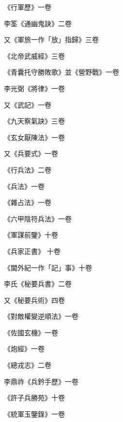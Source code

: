 \begin{pinyinscope}
 《行軍歷》一卷



 李筌《通幽鬼訣》二卷



 又《軍旅一作「放」指歸》三卷



 《北帝武威經》三卷



 《青囊托守勝敗歌》並《營野戰》一卷



 李光弼《將律》一卷



 又《武記》一卷



 《九天察氣訣》三卷



 《玄女厭陳法》一卷



 又《兵要式》一卷



 《行兵法》二卷



 《兵法》一卷



 《雜占法》一卷



 《六甲陰符兵法》一卷



 《軍謀前鑒》十卷



 《兵家正書》
 十卷



 《閫外紀一作「記」事》十卷



 李氏《秘要兵書》二卷



 又《秘要兵術》四卷



 《對敵權變逆順法》一卷



 《佐國玄機》一卷



 《炮經》一卷



 《總戎志》二卷



 李鼎祚《兵鈐手歷》一卷



 《許子兵勝苑》十卷



 《統軍玉鑒錄》一卷




\end{pinyinscope}
